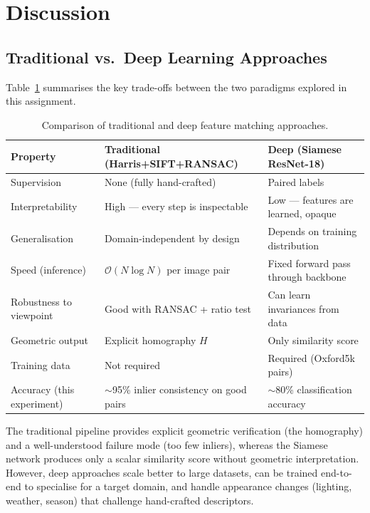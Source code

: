\documentclass[11pt,letterpaper]{article}
\begin{document}
\section{Discussion}

\subsection{Traditional vs.\ Deep Learning Approaches}

Table~\ref{tab:comparison} summarises the key trade-offs between the two paradigms explored in this assignment.

\begin{table}[H]
  \centering
  \small
  \begin{tabular}{p{3.2cm}p{5.5cm}p{5.5cm}}
    \toprule
    \textbf{Property} & \textbf{Traditional (Harris+SIFT+RANSAC)} & \textbf{Deep (Siamese ResNet-18)} \\
    \midrule
    Supervision & None (fully hand-crafted) & Paired labels \\
    Interpretability & High — every step is inspectable & Low — features are learned, opaque \\
    Generalisation & Domain-independent by design & Depends on training distribution \\
    Speed (inference) & $\mathcal{O}(N\log N)$ per image pair & Fixed forward pass through backbone \\
    Robustness to viewpoint & Good with RANSAC + ratio test & Can learn invariances from data \\
    Geometric output & Explicit homography $H$ & Only similarity score \\
    Training data & Not required & Required (Oxford5k pairs) \\
    Accuracy (this experiment) & $\sim$95\% inlier consistency on good pairs & $\sim$80\% classification accuracy \\
    \bottomrule
  \end{tabular}
  \caption{Comparison of traditional and deep feature matching approaches.}
  \label{tab:comparison}
\end{table}

The traditional pipeline provides explicit geometric verification (the homography) and a well-understood failure mode (too few inliers), whereas the Siamese network produces only a scalar similarity score without geometric interpretation. However, deep approaches scale better to large datasets, can be trained end-to-end to specialise for a target domain, and handle appearance changes (lighting, weather, season) that challenge hand-crafted descriptors.
\end{document}
